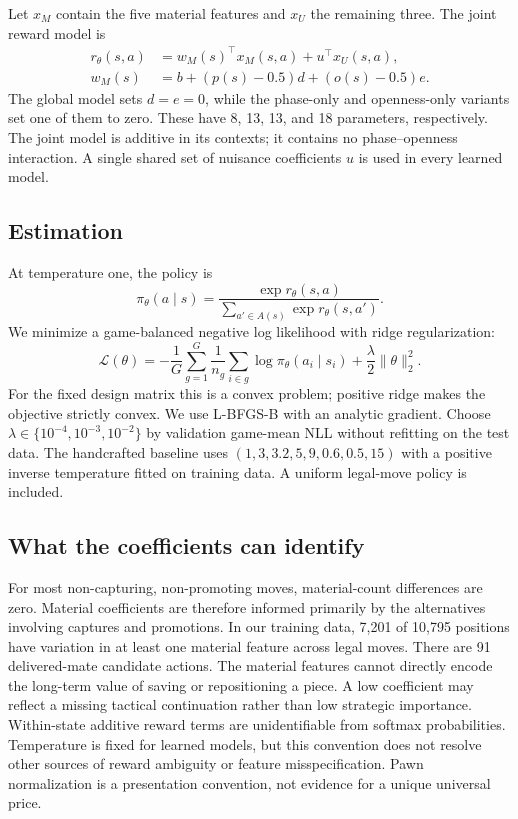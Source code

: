 \documentclass[11pt]{article}
\begin{document}
Let $x_M$ contain the five material features and $x_U$ the remaining three. The joint reward model is
\begin{align}
r_\theta(s,a)&=w_M(s)^\top x_M(s,a)+u^\top x_U(s,a),\\
w_M(s)&=b+(p(s)-0.5)d+(o(s)-0.5)e.
\end{align}
The global model sets $d=e=0$, while the phase-only and openness-only variants set one of them to zero. These have 8, 13, 13, and 18 parameters, respectively. The joint model is additive in its contexts; it contains no phase--openness interaction. A single shared set of nuisance coefficients $u$ is used in every learned model.

\subsection{Estimation}
At temperature one, the policy is
\[
\pi_\theta(a\mid s)=\frac{\exp r_\theta(s,a)}{\sum_{a'\in A(s)}\exp r_\theta(s,a')}.
\]
We minimize a game-balanced negative log likelihood with ridge regularization:
\[
\mathcal L(\theta)=-\frac1G\sum_{g=1}^G\frac1{n_g}
\sum_{i\in g}\log\pi_\theta(a_i\mid s_i)+\frac\lambda2\|\theta\|_2^2.
\]
For the fixed design matrix this is a convex problem; positive ridge makes the objective strictly convex. We use L-BFGS-B with an analytic gradient. Choose $\lambda\in\{10^{-4},10^{-3},10^{-2}\}$ by validation game-mean NLL without refitting on the test data. The handcrafted baseline uses $(1,3,3.2,5,9,0.6,0.5,15)$ with a positive inverse temperature fitted on training data. A uniform legal-move policy is included.

\subsection{What the coefficients can identify}
For most non-capturing, non-promoting moves, material-count differences are zero. Material coefficients are therefore informed primarily by the alternatives involving captures and promotions. In our training data, 7,201 of 10,795 positions have variation in at least one material feature across legal moves. There are 91 delivered-mate candidate actions. The material features cannot directly encode the long-term value of saving or repositioning a piece. A low coefficient may reflect a missing tactical continuation rather than low strategic importance. Within-state additive reward terms are unidentifiable from softmax probabilities. Temperature is fixed for learned models, but this convention does not resolve other sources of reward ambiguity or feature misspecification. Pawn normalization is a presentation convention, not evidence for a unique universal price.
\end{document}
